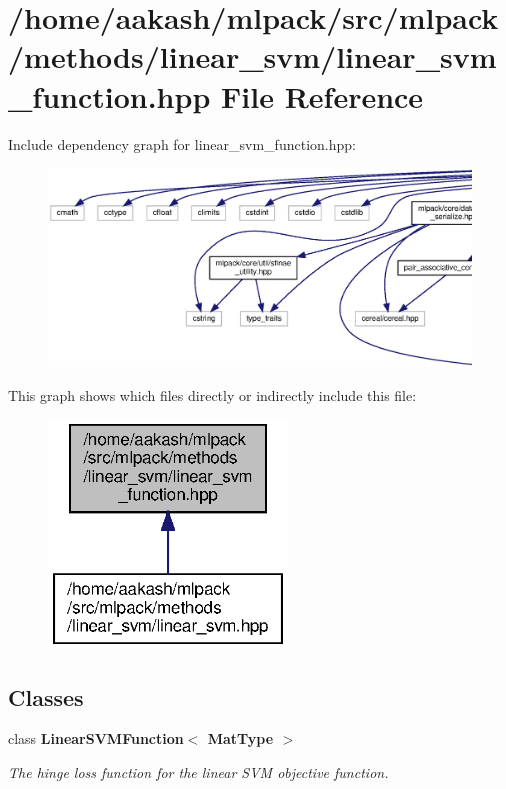 \section{/home/aakash/mlpack/src/mlpack/methods/linear\+\_\+svm/linear\+\_\+svm\+\_\+function.hpp File Reference}
\label{linear__svm__function_8hpp}
Include dependency graph for linear\+\_\+svm\+\_\+function.\+hpp\+:
\nopagebreak
\begin{figure}[H]
\begin{center}
\leavevmode
\includegraphics[width=350pt]{linear__svm__function_8hpp__incl}
\end{center}
\end{figure}
This graph shows which files directly or indirectly include this file\+:
\nopagebreak
\begin{figure}[H]
\begin{center}
\leavevmode
\includegraphics[width=180pt]{linear__svm__function_8hpp__dep__incl}
\end{center}
\end{figure}
\subsection*{Classes}
\begin{DoxyCompactItemize}
\item 
class \textbf{ Linear\+S\+V\+M\+Function$<$ Mat\+Type $>$}
\begin{DoxyCompactList}\small\item\em The hinge loss function for the linear S\+VM objective function. \end{DoxyCompactList}\end{DoxyCompactItemize}
